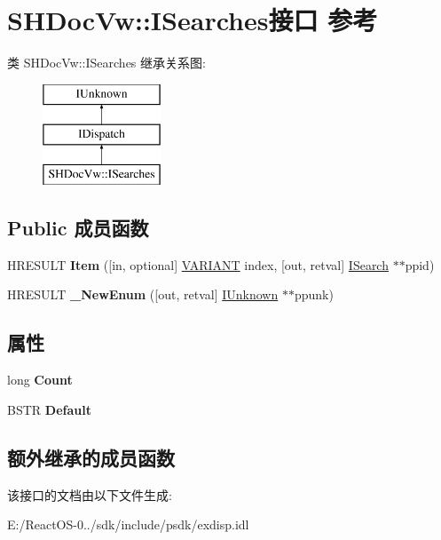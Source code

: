 \hypertarget{interface_s_h_doc_vw_1_1_i_searches}{}\section{S\+H\+Doc\+Vw\+:\+:I\+Searches接口 参考}
\label{interface_s_h_doc_vw_1_1_i_searches}
类 S\+H\+Doc\+Vw\+:\+:I\+Searches 继承关系图\+:\begin{figure}[H]
\begin{center}
\leavevmode
\includegraphics[height=3.000000cm]{interface_s_h_doc_vw_1_1_i_searches}
\end{center}
\end{figure}
\subsection*{Public 成员函数}
\begin{DoxyCompactItemize}
\item 
\mbox{\label{interface_s_h_doc_vw_1_1_i_searches_ac1dc24a58a578d88164024be7342203a}} 
H\+R\+E\+S\+U\+LT {\bfseries Item} (\mbox{[}in, optional\mbox{]} \hyperlink{structtag_v_a_r_i_a_n_t}{V\+A\+R\+I\+A\+NT} index, \mbox{[}out, retval\mbox{]} \hyperlink{interface_s_h_doc_vw_1_1_i_search}{I\+Search} $\ast$$\ast$ppid)
\item 
\mbox{\label{interface_s_h_doc_vw_1_1_i_searches_aabf527c5a7caa55f93d0cd92eb65dbc3}} 
H\+R\+E\+S\+U\+LT {\bfseries \+\_\+\+New\+Enum} (\mbox{[}out, retval\mbox{]} \hyperlink{interface_i_unknown}{I\+Unknown} $\ast$$\ast$ppunk)
\end{DoxyCompactItemize}
\subsection*{属性}
\begin{DoxyCompactItemize}
\item 
\mbox{\label{interface_s_h_doc_vw_1_1_i_searches_aaa9c6600a8fc6bbc76de19c0bd3ef652}} 
long {\bfseries Count}
\item 
\mbox{\label{interface_s_h_doc_vw_1_1_i_searches_a387add9e5835028eea067c553858bd81}} 
B\+S\+TR {\bfseries Default}
\end{DoxyCompactItemize}
\subsection*{额外继承的成员函数}


该接口的文档由以下文件生成\+:\begin{DoxyCompactItemize}
\item 
E\+:/\+React\+O\+S-\/0../sdk/include/psdk/exdisp.\+idl\end{DoxyCompactItemize}
